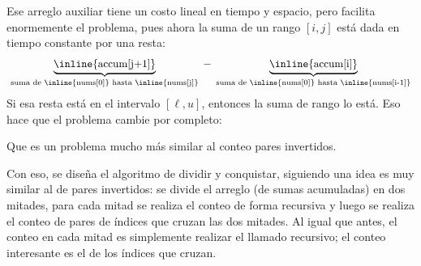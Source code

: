 Ese arreglo auxiliar tiene un costo lineal en tiempo y espacio, pero facilita enormemente el problema, pues ahora la suma de un rango \([i, j]\) está dada en tiempo constante por una resta:
\[
\underbrace{
  \text{\inline{accum[j+1]}}
}_{
  \text{
    suma de \inline{nums[0]} hasta \inline{nums[j]}
  }
} - \underbrace{
  \text{\inline{accum[i]}}
}_{
  \text{
    suma de \inline{nums[0]} hasta \inline{nums[i-1]}
  }
}
\]
Si esa resta está en el intervalo \([\ell, u]\), entonces la suma de rango lo está. Eso hace que el problema cambie por completo:
\begin{especificacion}
\end{especificacion}
Que es un problema mucho más similar al conteo pares invertidos.

Con eso, se diseña el algoritmo de dividir y conquistar, siguiendo una idea es muy similar al de pares invertidos: se divide el arreglo (de sumas acumuladas) en dos mitades, para cada mitad se realiza el conteo de forma recursiva y luego se realiza el conteo de pares de índices que cruzan las dos mitades. Al igual que antes, el conteo en cada mitad es simplemente realizar el llamado recursivo; el conteo interesante es el de los índices que cruzan.



